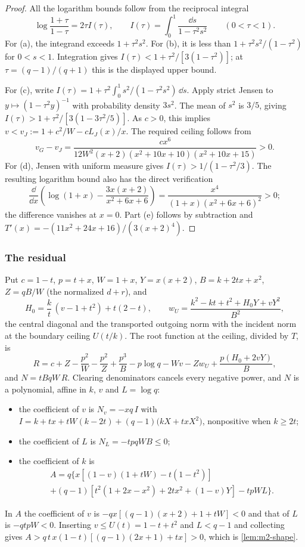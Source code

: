 \begin{proof}
All the logarithm bounds follow from the reciprocal integral
\[
 \log\frac{1+\tau}{1-\tau}=2\tau I(\tau),\qquad
 I(\tau)=\int_0^1\frac{\dd s}{1-\tau^2s^2}\qquad(0<\tau<1).
\]
For (a), the integrand exceeds $1+\tau^2s^2$. For (b), it is less than
$1+\tau^2s^2/(1-\tau^2)$ for $0<s<1$. Integration gives
$I(\tau)<1+\tau^2/[3(1-\tau^2)]$; at $\tau=(q-1)/(q+1)$ this is the displayed upper bound.

For (c), write
$I(\tau)=1+\tau^2\int_0^1s^2/(1-\tau^2s^2)\,\dd s$.
Apply strict Jensen to $y\mapsto(1-\tau^2y)^{-1}$ with probability density $3s^2$.
The mean of $s^2$ is $3/5$, giving $I(\tau)>1+\tau^2/[3(1-3\tau^2/5)]$.
As $c>0$, this implies $v<v_J:=1+c^2/W-cL_J(x)/x$. The required ceiling follows from
\[
 v_G-v_J=\frac{cx^6}{12W^2(x+2)(x^2+10x+10)(x^2+10x+15)}>0.
\]
For (d), Jensen with uniform measure gives $I(\tau)>1/(1-\tau^2/3)$.
The resulting logarithm bound also has the direct verification
\[
 \frac{\dd}{\dd x}\left(\log(1+x)-\frac{3x(x+2)}{x^2+6x+6}\right)
 =\frac{x^4}{(1+x)(x^2+6x+6)^2}>0;
\]
the difference vanishes at $x=0$. Part (e) follows by subtraction and
$T'(x)=-(11x^2+24x+16)/(3(x+2)^4)$.
\end{proof}

\subsubsection{The residual}\label{app:m2-residual}

Put $c=1-t$, $p=t+x$, $W=1+x$, $Y=x(x+2)$, $B=k+2tx+x^2$, $Z=qB/W$ (the normalized $d+r$), and
\[
H_0=\frac kt\,(v-1+t^2)+t(2-t),\qquad w_U=\frac{k^2-kt+t^2+H_0Y+vY^2}{B^2},
\]
the central diagonal and the transported outgoing norm with the incident norm at the boundary
ceiling $U(t/k)$. The root function at the ceiling, divided by $T$, is
\[
R=c+Z-\frac{p^2}{W}-\frac{p^2}{Z}+\frac{p^3}{B}-p\log q-Wv-Zw_U+\frac{p(H_0+2vY)}{B},
\]
and $N=tBqW\,R$. Clearing denominators cancels every negative power, and $N$ is a polynomial,
affine in $k$, $v$ and $L=\log q$:
\begin{itemize}
\item the coefficient of $v$ is $N_v=-xq\,I$ with
$I=k+tx+tW(k-2t)+(q-1)\bigl(kX+txX^2\bigr)$, nonpositive when $k\ge2t$;
\item the coefficient of $L$ is $N_L=-tpqWB\le0$;
\item the coefficient of $k$ is
\begin{multline*}
A=q\bigl\{x[(1-v)(1+tW)-t(1-t^2)]\\
+(q-1)[t^2(1+2x-x^2)+2tx^2+(1-v)Y]-tpW L\bigr\}.
\end{multline*}
\end{itemize}
In $A$ the coefficient of $v$ is $-qx[(q-1)(x+2)+1+tW]<0$ and that of $L$ is $-qtpW<0$. Inserting
$v\le U(t)=1-t+t^2$ and $L<q-1$ and collecting gives
$A>q\,t\,x(1-t)[(q-1)(2x+1)+tx]>0$, which is \cref{lem:m2-shape}.

